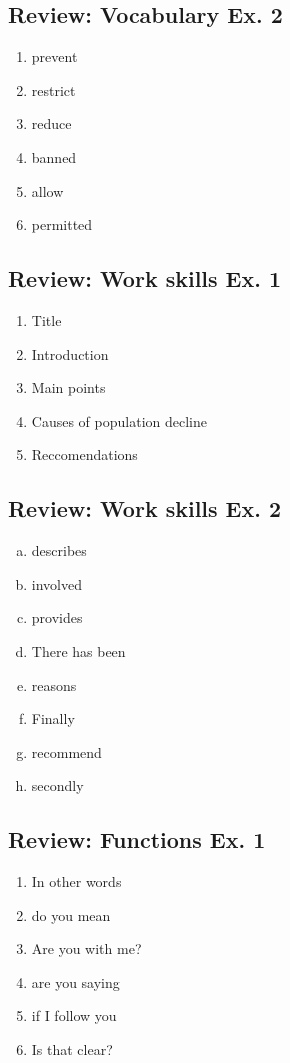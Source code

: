 \documentclass[12pt, a4paper, oneside]{article}
\begin{document}
  \subsection{Review: Vocabulary Ex. 2}
  \begin{enumerate}[1.]
    \item prevent 
    \item restrict
    \item reduce
    \item banned
    \item allow
    \item permitted
  \end{enumerate}

  \subsection{Review: Work skills Ex. 1}
  \begin{enumerate}[1.]
    \item Title
    \item Introduction
    \item Main points
    \item Causes of population decline
    \item Reccomendations
  \end{enumerate}

  \subsection{Review: Work skills Ex. 2}
  \begin{enumerate}[a.]
    \item describes
    \item involved
    \item provides
    \item There has been
    \item reasons
    \item Finally
    \item recommend
    \item secondly
  \end{enumerate}

  \subsection{Review: Functions Ex. 1}
  \begin{enumerate}[1.]
    \item In other words
    \item do you mean
    \item Are you with me?
    \item are you saying
    \item if I follow you
    \item Is that clear?
  \end{enumerate}
\end{document}
